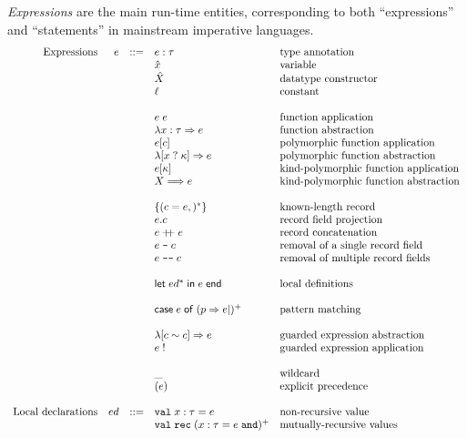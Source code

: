 \documentclass{article}
\newcommand{\cd}[1]{\texttt{#1}}
\newcommand{\mt}[1]{\mathsf{#1}}
\newcommand{\rc}{+ \hspace{-.075in} + \;}
\newcommand{\rcut}{\; \texttt{--} \;}
\newcommand{\rcutM}{\; \texttt{---} \;}
\begin{document}
\emph{Expressions} are the main run-time entities, corresponding to both ``expressions'' and ``statements'' in mainstream imperative languages.
$$\begin{array}{rrcll}
  \textrm{Expressions} & e &::=& e : \tau & \textrm{type annotation} \\
  &&& \hat{x} & \textrm{variable} \\
  &&& \hat{X} & \textrm{datatype constructor} \\
  &&& \ell & \textrm{constant} \\
  \\
  &&& e \; e & \textrm{function application} \\
  &&& \lambda x : \tau \Rightarrow e & \textrm{function abstraction} \\
  &&& e [c] & \textrm{polymorphic function application} \\
  &&& \lambda [x \; ? \; \kappa] \Rightarrow e & \textrm{polymorphic function abstraction} \\
  &&& e [\kappa] & \textrm{kind-polymorphic function application} \\
  &&& X \Longrightarrow e & \textrm{kind-polymorphic function abstraction} \\
  \\
  &&& \{(c = e,)^*\} & \textrm{known-length record} \\
  &&& e.c & \textrm{record field projection} \\
  &&& e \rc e & \textrm{record concatenation} \\
  &&& e \rcut c & \textrm{removal of a single record field} \\
  &&& e \rcutM c & \textrm{removal of multiple record fields} \\
  \\
  &&& \mt{let} \; ed^* \; \mt{in} \; e \; \mt{end} & \textrm{local definitions} \\
  \\
  &&& \mt{case} \; e \; \mt{of} \; (p \Rightarrow e|)^+ & \textrm{pattern matching} \\
  \\
  &&& \lambda [c \sim c] \Rightarrow e & \textrm{guarded expression abstraction} \\
  &&& e \; ! & \textrm{guarded expression application} \\
  \\
  &&& \_ & \textrm{wildcard} \\
  &&& (e) & \textrm{explicit precedence} \\
  \\
  \textrm{Local declarations} & ed &::=& \cd{val} \; x : \tau = e & \textrm{non-recursive value} \\
  &&& \cd{val} \; \cd{rec} \; (x : \tau = e \; \cd{and})^+ & \textrm{mutually-recursive values} \\
\end{array}$$
\end{document}
